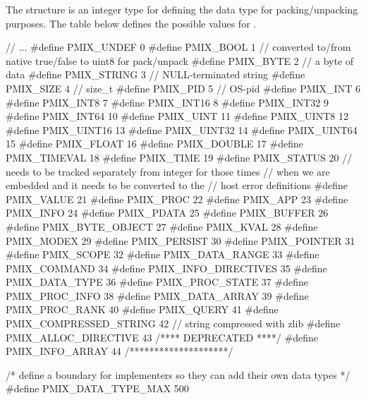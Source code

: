 The  structure is an integer type for defining the data type for packing/unpacking purposes.
The table below defines the possible values for .

\cspecificstart
\begin{codepar}
// ...
#define PMIX_UNDEF               0
#define PMIX_BOOL                1  // converted to/from native true/false to uint8 for pack/unpack
#define PMIX_BYTE                2  // a byte of data
#define PMIX_STRING              3  // NULL-terminated string
#define PMIX_SIZE                4  // size_t
#define PMIX_PID                 5  // OS-pid
#define PMIX_INT                 6
#define PMIX_INT8                7
#define PMIX_INT16               8
#define PMIX_INT32               9
#define PMIX_INT64              10
#define PMIX_UINT               11
#define PMIX_UINT8              12
#define PMIX_UINT16             13
#define PMIX_UINT32             14
#define PMIX_UINT64             15
#define PMIX_FLOAT              16
#define PMIX_DOUBLE             17
#define PMIX_TIMEVAL            18
#define PMIX_TIME               19
#define PMIX_STATUS             20  // needs to be tracked separately from integer for those times
                                    // when we are embedded and it needs to be converted to the
                                    // host error definitions
#define PMIX_VALUE              21
#define PMIX_PROC               22
#define PMIX_APP                23
#define PMIX_INFO               24
#define PMIX_PDATA              25
#define PMIX_BUFFER             26
#define PMIX_BYTE_OBJECT        27
#define PMIX_KVAL               28
#define PMIX_MODEX              29
#define PMIX_PERSIST            30
#define PMIX_POINTER            31
#define PMIX_SCOPE              32
#define PMIX_DATA_RANGE         33
#define PMIX_COMMAND            34
#define PMIX_INFO_DIRECTIVES    35
#define PMIX_DATA_TYPE          36
#define PMIX_PROC_STATE         37
#define PMIX_PROC_INFO          38
#define PMIX_DATA_ARRAY         39
#define PMIX_PROC_RANK          40
#define PMIX_QUERY              41
#define PMIX_COMPRESSED_STRING  42  // string compressed with zlib
#define PMIX_ALLOC_DIRECTIVE    43
/**** DEPRECATED ****/
#define PMIX_INFO_ARRAY         44
/********************/

/* define a boundary for implementers so they can add their own data types */
#define PMIX_DATA_TYPE_MAX     500
\end{codepar}
\cspecificend


